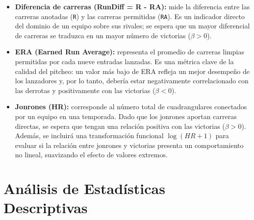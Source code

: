 \documentclass[10pt]{article}
\begin{document}
\begin{itemize}
    \item \textbf{Diferencia de carreras (RunDiff = R - RA):} mide la diferencia entre las carreras anotadas (\texttt{R}) y las carreras permitidas (\texttt{RA}). Es un indicador directo del dominio de un equipo sobre sus rivales; se espera que un mayor diferencial de carreras se traduzca en un mayor número de victorias (\(\beta > 0\)). 
    \item \textbf{ERA (Earned Run Average):} representa el promedio de carreras limpias permitidas por cada nueve entradas lanzadas. Es una métrica clave de la calidad del pitcheo: un valor más bajo de ERA refleja un mejor desempeño de los lanzadores y, por lo tanto, debería estar negativamente correlacionado con las derrotas y positivamente con las victorias (\(\beta < 0\)). 
    \item \textbf{Jonrones (HR):} corresponde al número total de cuadrangulares conectados por un equipo en una temporada. Dado que los jonrones aportan carreras directas, se espera que tengan una relación positiva con las victorias (\(\beta > 0\)). Además, se incluirá una transformación funcional \(\log(HR+1)\) para evaluar si la relación entre jonrones y victorias presenta un comportamiento no lineal, suavizando el efecto de valores extremos.
\end{itemize}
\section{Análisis de Estadísticas Descriptivas}
\end{document}
